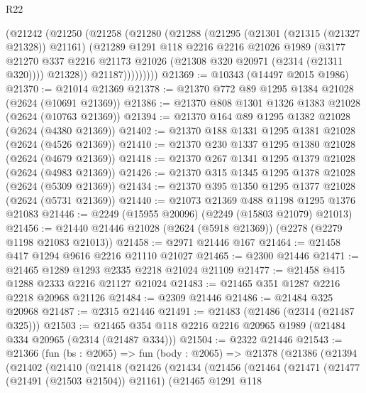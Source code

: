 \begin{lexlean}{R22}
\begin{coremodule}
            (@21242
              (@21250
                (@21258
                  (@21280
                    (@21288
                      (@21295
                        (@21301 (@21315 (@21327 @21328)) @21161)
                        (@21289
                          @1291
                          @118
                          @2216
                          @2216
                          @21026
                          @1989
                          (@3177
                            @21270
                            @337
                            @2216
                            @21173
                            @21026
                            (@21308 @320 @20971 (@2314 (@21311 @320))))
                          @21328))
                      @21187)))))))))
@21369 := @10343 (@14497 @2015 @1986)
@21370 := @21014 @21369
@21378 := @21370 @772 @89 @1295 @1384 @21028 (@2624 (@10691 @21369))
@21386 := @21370 @808 @1301 @1326 @1383 @21028 (@2624 (@10763 @21369))
@21394 := @21370 @164 @89 @1295 @1382 @21028 (@2624 (@4380 @21369))
@21402 := @21370 @188 @1331 @1295 @1381 @21028 (@2624 (@4526 @21369))
@21410 := @21370 @230 @1337 @1295 @1380 @21028 (@2624 (@4679 @21369))
@21418 := @21370 @267 @1341 @1295 @1379 @21028 (@2624 (@4983 @21369))
@21426 := @21370 @315 @1345 @1295 @1378 @21028 (@2624 (@5309 @21369))
@21434 := @21370 @395 @1350 @1295 @1377 @21028 (@2624 (@5731 @21369))
@21440 := @21073 @21369 @488 @1198 @1295 @1376 @21083
@21446 := @2249 (@15955 @20096) (@2249 (@15803 @21079) @21013)
@21456 := @21440 @21446 @21028 (@2624 (@5918 @21369)) (@2278 (@2279 @1198 @21083 @21013))
@21458 := @2971 @21446 @167
@21464 := @21458 @417 @1294 @9616 @2216 @21110 @21027
@21465 := @2300 @21446
@21471 := @21465 @1289 @1293 @2335 @2218 @21024 @21109
@21477 := @21458 @415 @1288 @2333 @2216 @21127 @21024
@21483 := @21465 @351 @1287 @2216 @2218 @20968 @21126
@21484 := @2309 @21446
@21486 := @21484 @325 @20968
@21487 := @2315 @21446
@21491 := @21483 (@21486 (@2314 (@21487 @325)))
@21503 := @21465 @354 @118 @2216 @2216 @20965 @1989 (@21484 @334 @20965 (@2314 (@21487 @334)))
@21504 := @2322 @21446
@21543 := @21366
    (fun (bs : @2065) =>
    fun (body : @2065) =>
    @21378
      (@21386
        (@21394
          (@21402
            (@21410
              (@21418
                (@21426
                  (@21434
                    (@21456
                      (@21464
                        (@21471
                          (@21477 (@21491 (@21503 @21504)) @21161)
                          (@21465
                            @1291
                            @118

\end{coremodule}
\end{lexlean}
